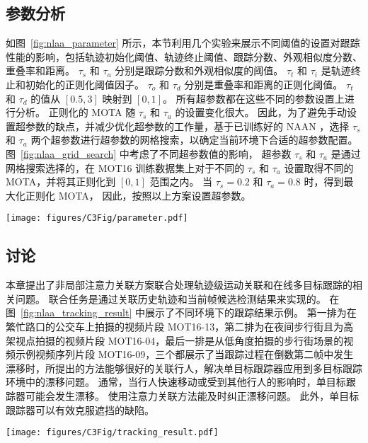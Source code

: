 \subsection{参数分析}
如图~\ref{fig:nlaa_parameter} 所示，本节利用几个实验来展示不同阈值的设置对跟踪性能的影响，包括轨迹初始化阈值、轨迹终止阈值、跟踪分数、外观相似度分数、重叠率和距离。 
$\tau_s$ 和 $\tau_a$ 分别是跟踪分数和外观相似度的阈值。
$\tau_t$ 和 $\tau_i$ 是轨迹终止和初始化的正则化阈值因子。
$\tau_o$ 和 $\tau_d$ 分别是重叠率和距离的正则化阈值。 
$\tau_t$ 和 $\tau_d$ 的值从 $ [0.5, 3] $ 映射到 $ [0, 1] $。
所有超参数都在这些不同的参数设置上进行分析。 
正则化的 MOTA 随 $\tau_s$ 和 $\tau_a$ 的设置变化很大。 
因此，为了避免手动设置超参数的缺点，并减少优化超参数的工作量，基于已训练好的 NAAN ，选择 $ \tau _s $ 和 $ \tau _a $ 两个超参数进行超参数的网格搜索，以确定当前环境下合适的超参数配置。
图~\ref{fig:nlaa_grid_search} 中考虑了不同超参数值的影响，
超参数 $\tau_s$ 和 $\tau_a$ 是通过网格搜索选择的，在 MOT16 训练数据集上对于不同的 $\tau_s$ 和 $\tau_a$ 设置取得不同的 MOTA，并将其正则化到 $\left[0,1\right]$ 范围之内。 
当 $\tau_s=0.2$ 和 $\tau_a=0.8$ 时，得到最大化正则化 MOTA，
因此，按照以上方案设置超参数。

\begin{figure*}[ht]
	\centering
	\texttt{[image: figures/C3Fig/parameter.pdf]}
	\caption{每个超参数对实验性能的影响}
	\label{fig:nlaa_parameter}
\end{figure*}


\subsection{讨论}
本章提出了非局部注意力关联方案联合处理轨迹级运动关联和在线多目标跟踪的相关问题。 
联合任务是通过关联历史轨迹和当前帧候选检测结果来实现的。 
在图~\ref{fig:nlaa_tracking_result} 中展示了不同环境下的跟踪结果示例。
第一排为在繁忙路口的公交车上拍摄的视频片段 MOT16-13，第二排为在夜间步行街且为高架视点拍摄的视频片段 MOT16-04，最后一排是从低角度拍摄的步行街场景的视频示例视频序列片段 MOT16-09，三个都展示了当跟踪过程在倒数第二帧中发生漂移时，所提出的方法能够很好的关联行人，解决单目标跟踪器应用到多目标跟踪环境中的漂移问题。
通常，当行人快速移动或受到其他行人的影响时，单目标跟踪器可能会发生漂移。 
使用注意力关联方法能及时纠正漂移问题。 
此外，单目标跟踪器可以有效克服遮挡的缺陷。
\begin{figure*}[ht]
	\centering
	\texttt{[image: figures/C3Fig/tracking\_result.pdf]}
	\caption{不同环境下的跟踪结果示例}
	\label{fig:nlaa_tracking_result}
\end{figure*}

